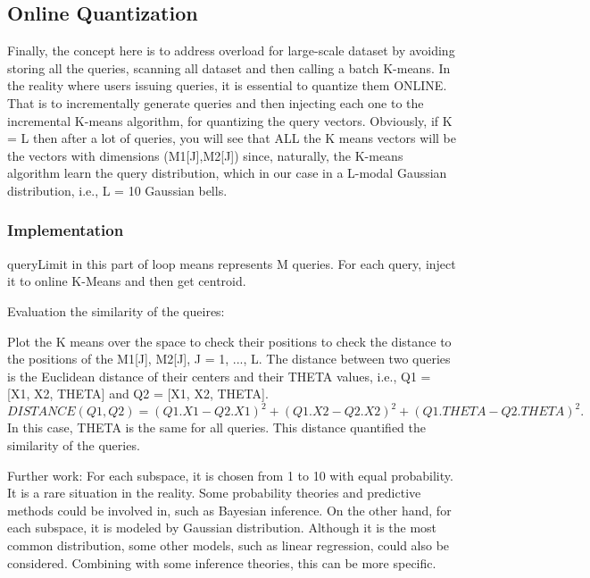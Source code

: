 \documentclass{lmproj}
\begin{document}
\subsection{Online Quantization}
Finally, the concept here is to address overload for large-scale dataset by avoiding storing all the queries, scanning all dataset and then calling a batch K-means. In the reality where users issuing queries, it is essential to quantize them ONLINE. That is to incrementally generate queries and then injecting each one to the incremental K-means algorithm, for quantizing the query vectors. Obviously, if K = L then after a lot of queries, you will see that ALL the K means vectors will be the vectors with dimensions (M1[J],M2[J]) since, naturally, the K-means algorithm learn the query distribution, which in our case in a L-modal Gaussian distribution, i.e., L = 10 Gaussian bells.

\subsubsection{Implementation}


queryLimit in this part of loop means represents M queries. For each query, inject it to online K-Means and then get centroid. 

Evaluation the similarity of the queires:

Plot the K means over the space to check their positions to check the distance to the positions of the M1[J], M2[J], J = 1, ..., L. The distance between two queries is the Euclidean distance of their centers and their THETA values, i.e., Q1 = [X1, X2, THETA] and Q2 = [X1, X2, THETA]. 
\begin{equation}
DISTANCE (Q1, Q2) = (Q1.X1-Q2.X1)^2+(Q1.X2-Q2.X2)^2+(Q1.THETA -Q2.THETA)^2.
\end{equation} 
In this case, THETA is the same for all queries. This distance quantified the similarity of the queries.

Further work:
For each subspace, it is chosen from 1 to 10 with equal probability. It is a rare situation in the reality. Some probability theories and predictive methods could be involved in, such as Bayesian inference. On the other hand, for each subspace, it is modeled by Gaussian distribution. Although it is the most common distribution, some other models, such as linear regression, could also be considered. Combining with some inference theories, this can be more specific. 
\end{document}
